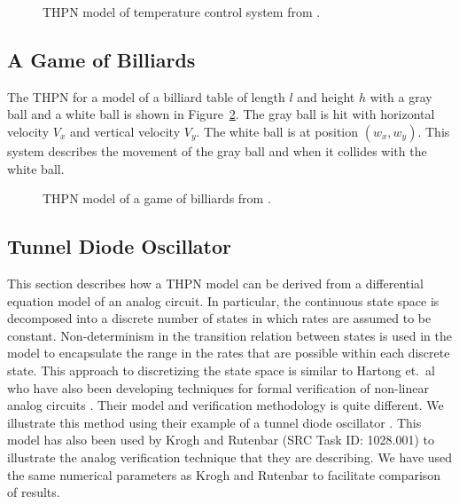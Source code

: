 \documentclass[11pt,times]{article}
\begin{document}
\begin{figure}[htbp]
\begin{center}
{\caption{\label{tcs}THPN model of temperature control system from
    \cite{alur95algorithmic}.}}
\end{center}
\end{figure}

\subsection{A Game of Billiards}

The THPN for a model of a billiard table of length $l$ and height $h$ with a 
gray ball and a white ball is shown in Figure~\ref{billiard}.
The gray ball is hit with horizontal velocity
$V_x$ and vertical velocity $V_y$.  The white ball is at position
$(w_x, w_y)$.  This system describes the movement of the gray ball and
when it collides with the white ball.  

\begin{figure}[htbp]
\begin{center}
{\caption{\label{billiard}THPN model of a game of billiards from
    \cite{alur95algorithmic}.}}
\end{center}
\end{figure}

\subsection{Tunnel Diode Oscillator}

This section describes how a THPN model can be derived from a differential
equation model of an analog circuit.  In particular, the continuous state
space is decomposed into a discrete number of states in which rates are assumed
to be constant.  Non-determinism in the transition relation between states is
used in the model to encapsulate the range in the rates that are possible
within each discrete state.  This approach to discretizing the state space
is similar to Hartong et.~al who have also been developing techniques for
formal verification of non-linear analog circuits 
\cite{Hartong2002a,Hartong2002b}.  Their model and verification 
methodology is quite different.  We illustrate this method using their example
of a tunnel diode oscillator \cite{Hartong2002b}.  This model has also been 
used by Krogh and Rutenbar (SRC Task ID: 1028.001) to illustrate the analog
verification technique that they are describing.  We have used the same
numerical parameters as Krogh and Rutenbar to facilitate comparison of results.
\end{document}
